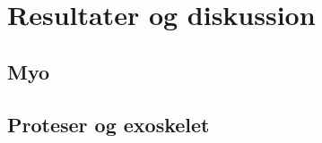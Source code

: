 \thispagestyle{fancy}
\chapter{Resultater og diskussion}
\label{chp:resultaterogdisk}

\section{Myo}

\section{Proteser og exoskelet}